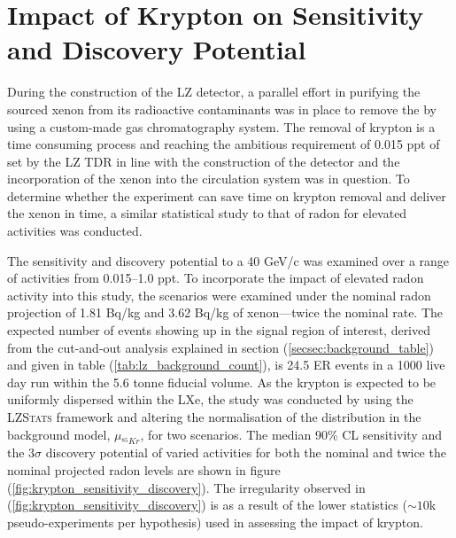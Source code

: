 {\clearpage

\section{Impact of Krypton on Sensitivity and Discovery Potential}
\label{sec:krypton_impact}

During the construction of the LZ detector, a parallel effort in purifying the sourced xenon from its radioactive contaminants was in place to remove the \KrEF{} by using a custom-made gas chromatography system. The removal of krypton is a time consuming process and reaching the ambitious requirement of 0.015 ppt of \KrEF{} set by the LZ TDR \cite{lz_tdr} in line with the construction of the detector and the incorporation of the xenon into the circulation system was in question. To determine whether the experiment can save time on krypton removal and deliver the xenon in time, a similar statistical study to that of radon for elevated \KrEF{} activities was conducted. 

The sensitivity and discovery potential to a 40 GeV/c\squared{} was examined over a range of \KrEF{} activities from 0.015--1.0 ppt. To incorporate the impact of elevated radon activity into this study, the \KrEF{} scenarios were examined under the nominal radon projection of 1.81 \micro{}Bq/kg and 3.62 \micro{}Bq/kg of xenon---twice the nominal rate. The expected number of \KrEF{} events showing up in the signal region of interest, derived from the cut-and-out analysis explained in section (\ref{secsec:background_table}) and given in table (\ref{tab:lz_background_count}), is 24.5 ER events in a 1000 live day run within the 5.6 tonne fiducial volume. As the krypton is expected to be uniformly dispersed within the LXe, the study was conducted by using the \textsc{LZStats} framework and altering the normalisation of the \KrEF{} distribution in the background model, $\mu_{^{85}Kr}$, for two \RnTTT{} scenarios. The median 90\% CL sensitivity and the $3\sigma$ discovery potential of varied \KrEF{} activities for both the nominal and twice the nominal projected radon levels are shown in figure (\ref{fig:krypton_sensitivity_discovery}). The irregularity observed in (\ref{fig:krypton_sensitivity_discovery}) is as a result of the lower statistics ($\sim10$k pseudo-experiments per hypothesis) used in assessing the impact of krypton.

}
